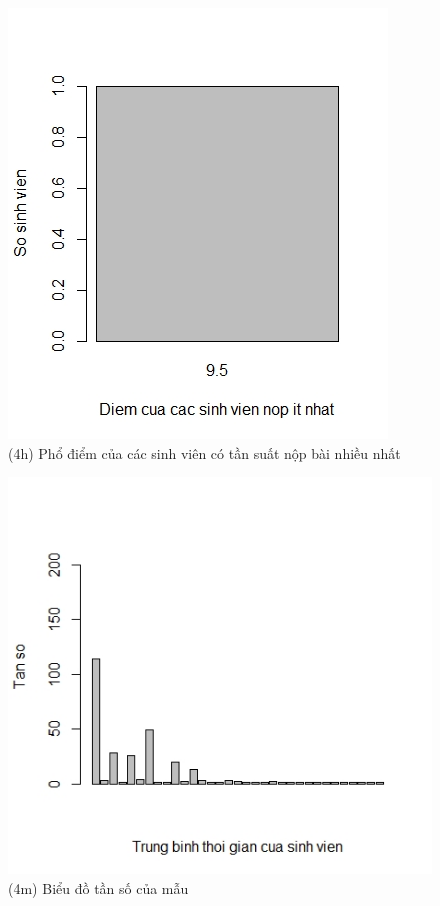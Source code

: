 \documentclass[a4paper]{article}
\theoremstyle{definition}
\begin{document}
\begin{figure}[!ht]
    \centering
    \includegraphics[scale=0.4]{Pics/q4h-file3.jpeg}
    \caption{(4h) Phổ điểm của các sinh viên có tần suất nộp bài nhiều nhất}
    \label{fig:my_label}
\end{figure}
\begin{figure}[!ht]
    \centering
    \includegraphics[scale=0.4]{Pics/q4m-file3.jpeg}
    \caption{(4m) Biểu đồ tần số của mẫu}
    \label{fig:my_label}
\end{figure}
\end{document}
